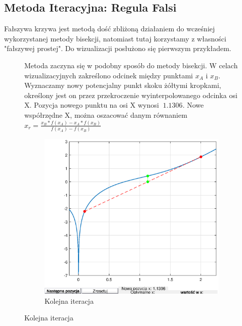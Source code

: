 \documentclass{article}
\begin{document}
\subsection{Metoda Iteracyjna: Regula Falsi}
Fałszywa krzywa jest metodą dość zbliżoną działaniem do wcześniej wykorzystanej metody bisekcji, natomiast tutaj korzystamy z własności "fałszywej prostej". Do wizualizacji posłużono się pierwszym przykładem.
\begin{figure}[H]
    \begin{multicols}{2}
        \null \vfill
        Metoda zaczyna się w podobny sposób do metody bisekcji. W celach wizualizacyjnych zakreślono odcinek między punktami $x_A$ i $x_B$. Wyznaczamy nowy potencjalny punkt skoku żółtymi kropkami, określony jest on przez przekroczenie wyinterpolowanego odcinka osi X. Pozycja nowego punktu na osi X wynosi $~1.1306$. Nowe współrzędne X, można oszacować danym równaniem $x_r = \frac{x_B*f(x_A) - x_A * f(x_B)}{f(x_A)-f(x_B)}$ 
        
        \vfill \null
        \par
        \begin{figure}[H]
            \centering
            \includegraphics[width=\linewidth]{img/falsi.eps}
        \caption{Kolejna iteracja}
            \label{fig:my_label}
        \end{figure}
    \end{multicols}
\end{figure}
\end{document}
